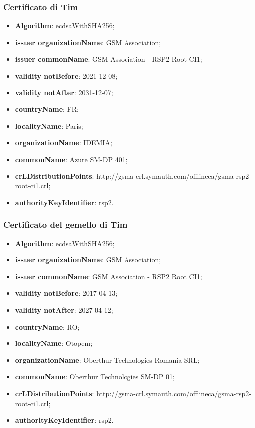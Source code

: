 \documentclass[10pt, oneside]{book}
\begin{document}
\subsubsection{Certificato di Tim}
\begin{itemize}
\item \textbf{Algorithm}: ecdsaWithSHA256;
\item \textbf{issuer organizationName}: GSM Association;
\item \textbf{issuer commonName}: GSM Association - RSP2 Root CI1;
\item \textbf{validity notBefore}: 2021-12-08;
\item \textbf{validity notAfter}: 2031-12-07;
\item \textbf{countryName}: FR;
\item \textbf{localityName}: Paris;
\item \textbf{organizationName}: IDEMIA;
\item \textbf{commonName}: Azure SM-DP 401;
\item \textbf{crLDistributionPoints}: http://gsma-crl.symauth.com/offlineca/gsma-rsp2-root-ci1.crl;
\item \textbf{authorityKeyIdentifier}: rsp2.
\end{itemize}

\subsubsection{Certificato del gemello di Tim}
\begin{itemize}
\item \textbf{Algorithm}: ecdsaWithSHA256;
\item \textbf{issuer organizationName}: GSM Association;
\item \textbf{issuer commonName}: GSM Association - RSP2 Root CI1;
\item \textbf{validity notBefore}: 2017-04-13;
\item \textbf{validity notAfter}: 2027-04-12;
\item \textbf{countryName}: RO;
\item \textbf{localityName}: Otopeni;
\item \textbf{organizationName}: Oberthur Technologies Romania SRL;
\item \textbf{commonName}: Oberthur Technologies SM-DP 01;
\item \textbf{crLDistributionPoints}: http://gsma-crl.symauth.com/offlineca/gsma-rsp2-root-ci1.crl;
\item \textbf{authorityKeyIdentifier}: rsp2.
\end{itemize}
\end{document}
